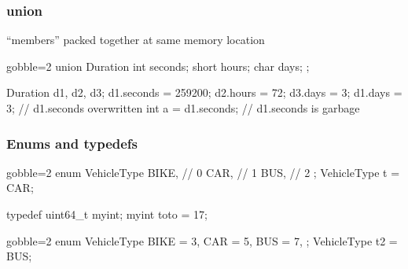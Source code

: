 \begin{frame}[fragile]
  \frametitle{union}
  \begin{mdframed}[style=simplebox]
    \center ``members'' packed together at same memory location
  \end{mdframed}
  \begin{multicols}{2}
    \begin{cppcode*}{gobble=2}
      union Duration {
        int seconds;
        short hours;
        char days;
      };

      Duration d1, d2, d3;
      d1.seconds = 259200;
      d2.hours = 72;
      d3.days = 3;
      d1.days = 3; // d1.seconds overwritten
      int a = d1.seconds; // d1.seconds is garbage
    \end{cppcode*}
    \pause
    \columnbreak
    \null \vfill
    \vfill \null
  \end{multicols}
\end{frame}

\begin{frame}[fragile]
  \frametitle{Enums and typedefs}
  \begin{multicols}{2}
    \begin{cppcode*}{gobble=2}
      enum VehicleType {
        BIKE,  // 0
        CAR,   // 1
        BUS,   // 2
      };
      VehicleType t = CAR;
      
      typedef uint64_t myint;
      myint toto = 17;
    \end{cppcode*}
    \columnbreak
    \begin{cppcode*}{gobble=2}
      enum VehicleType {
        BIKE = 3,
        CAR = 5,
        BUS = 7,
      };
      VehicleType t2 = BUS;
    \end{cppcode*}
  \end{multicols}
\end{frame}


